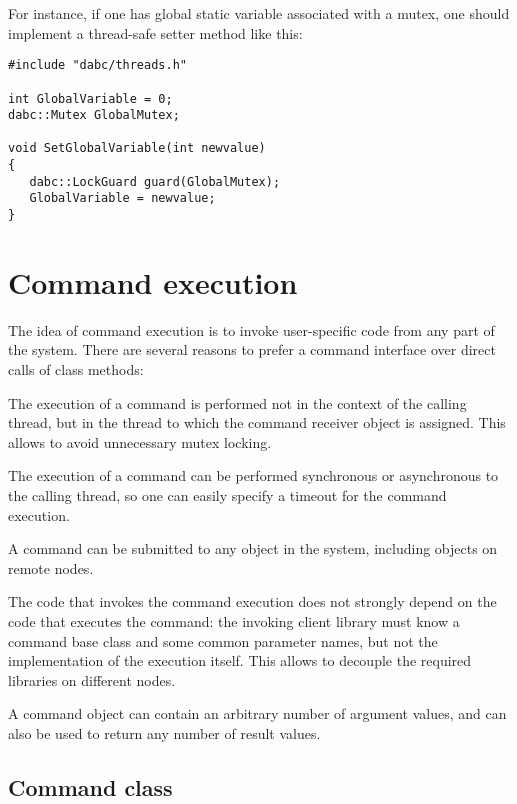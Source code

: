 For instance, if one has global static variable 
associated with a mutex, one should implement 
a thread-safe setter method like this:
\begin{small}
\begin{verbatim}
#include "dabc/threads.h"

int GlobalVariable = 0;
dabc::Mutex GlobalMutex;

void SetGlobalVariable(int newvalue) 
{
   dabc::LockGuard guard(GlobalMutex);
   GlobalVariable = newvalue;
}
\end{verbatim}     
\end{small}


\section{Command execution}
\label{prog_services_commands}

The idea of command execution is to invoke user-specific 
code from any part of the system. 
There are several reasons to prefer a command interface over  
direct calls of class methods:
\bbul
\item The execution of a command is performed not in the context of the calling thread, 
but in the thread to which the command receiver object is assigned. 
This allows to avoid unnecessary mutex locking.

\item The execution of a command can be performed synchronous or asynchronous to the
calling thread, so one can easily specify a timeout for the command execution.
 
\item A command can be submitted to any object in the system, including objects on remote nodes.    

\item The code that invokes the command execution does not strongly depend
on the code that executes the command: the invoking client library 
must know a command base class and some common parameter names, 
but not the implementation of the execution itself.
This allows to decouple the required libraries on different nodes.

\item A command object can contain an arbitrary number of argument 
      values, and can also be used to return any number of result values.
          

\ebul 

\subsection{Command class}


